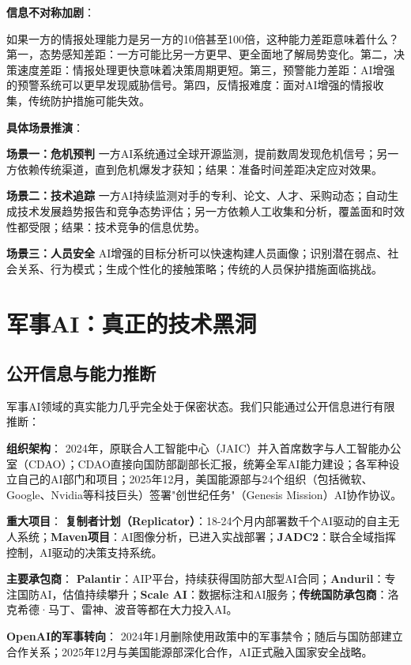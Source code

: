 \textbf{信息不对称加剧}：

如果一方的情报处理能力是另一方的10倍甚至100倍，这种能力差距意味着什么？
第一，态势感知差距：一方可能比另一方更早、更全面地了解局势变化。第二，决策速度差距：情报处理更快意味着决策周期更短。第三，预警能力差距：AI增强的预警系统可以更早发现威胁信号。第四，反情报难度：面对AI增强的情报收集，传统防护措施可能失效。

\textbf{具体场景推演}：

\textbf{场景一：危机预判}
一方AI系统通过全球开源监测，提前数周发现危机信号；另一方依赖传统渠道，直到危机爆发才获知；结果：准备时间差距决定应对效果。

\textbf{场景二：技术追踪}
一方AI持续监测对手的专利、论文、人才、采购动态；自动生成技术发展趋势报告和竞争态势评估；另一方依赖人工收集和分析，覆盖面和时效性都受限；结果：技术竞争的信息优势。

\textbf{场景三：人员安全}
AI增强的目标分析可以快速构建人员画像；识别潜在弱点、社会关系、行为模式；生成个性化的接触策略；传统的人员保护措施面临挑战。

\section{军事AI：真正的技术黑洞}

\subsection{公开信息与能力推断}

军事AI领域的真实能力几乎完全处于保密状态。我们只能通过公开信息进行有限推断：

\textbf{组织架构}：
2024年，原联合人工智能中心（JAIC）并入首席数字与人工智能办公室（CDAO）；CDAO直接向国防部副部长汇报，统筹全军AI能力建设；各军种设立自己的AI部门和项目；2025年12月，美国能源部与24个组织（包括微软、Google、Nvidia等科技巨头）签署"创世纪任务"（Genesis Mission）AI协作协议。

\textbf{重大项目}：
\textbf{复制者计划（Replicator）}：18-24个月内部署数千个AI驱动的自主无人系统；\textbf{Maven项目}：AI图像分析，已进入实战部署；\textbf{JADC2}：联合全域指挥控制，AI驱动的决策支持系统。

\textbf{主要承包商}：
\textbf{Palantir}：AIP平台，持续获得国防部大型AI合同；\textbf{Anduril}：专注国防AI，估值持续攀升；\textbf{Scale AI}：数据标注和AI服务；\textbf{传统国防承包商}：洛克希德·马丁、雷神、波音等都在大力投入AI。

\textbf{OpenAI的军事转向}：
2024年1月删除使用政策中的军事禁令；随后与国防部建立合作关系；2025年12月与美国能源部深化合作，AI正式融入国家安全战略。

